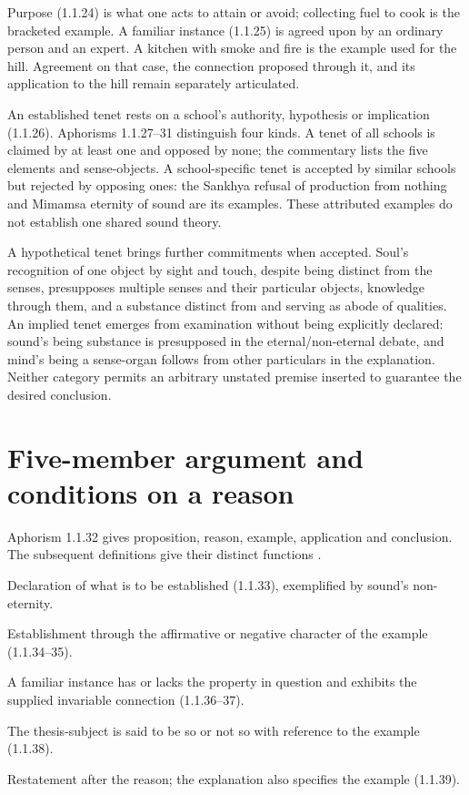 Purpose (1.1.24) is what one acts to attain or avoid; collecting fuel to cook
is the bracketed example. A familiar instance (1.1.25) is agreed upon by an
ordinary person and an expert. A kitchen with smoke and fire is the example
used for the hill. Agreement on that case, the connection proposed through it,
and its application to the hill remain separately articulated.

An established tenet rests on a school's authority, hypothesis or implication
(1.1.26). Aphorisms 1.1.27--31 distinguish four kinds. A tenet of all schools
is claimed by at least one and opposed by none; the commentary lists the
five elements and sense-objects. A school-specific tenet is accepted by
similar schools but rejected by opposing ones: the Sankhya refusal of
production from nothing and Mimamsa eternity of sound are its examples.
These attributed examples do not establish one shared sound theory.

A hypothetical tenet brings further commitments when accepted. Soul's
recognition of one object by sight and touch, despite being distinct from
the senses, presupposes multiple senses and their particular objects,
knowledge through them, and a substance distinct from and serving as
abode of qualities. An implied tenet emerges from examination without
being explicitly declared: sound's being substance is presupposed in the
eternal/non-eternal debate, and mind's being a sense-organ follows from
other particulars in the explanation. Neither category permits an arbitrary
unstated premise inserted to guarantee the desired conclusion.

\section{Five-member argument and conditions on a reason}
\label{sec:p13-nyaya-five-members}

Aphorism 1.1.32 gives proposition, reason, example, application and conclusion.
The subsequent definitions give their distinct functions
\cite[1.1.32--39, pp.~10--13]{GotamaVidyabhusana1913NyayaSutras}.

\begin{description}[style=nextline,leftmargin=0pt]
 \item[Proposition.] Declaration of what is to be established (1.1.33),
 exemplified by sound's non-eternity.
 \item[Reason.] Establishment through the affirmative or negative
 character of the example (1.1.34--35).
 \item[Example.] A familiar instance has or lacks the property in question
 and exhibits the supplied invariable connection (1.1.36--37).
 \item[Application.] The thesis-subject is said to be so or not so with
 reference to the example (1.1.38).
 \item[Conclusion.] Restatement after the reason; the explanation also
 specifies the example (1.1.39).
\end{description}

